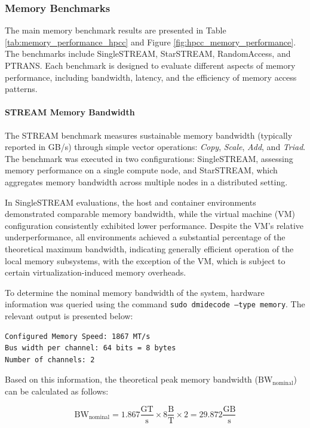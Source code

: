\subsubsection{Memory Benchmarks}
The main memory benchmark results are presented in Table \ref{tab:memory_performance_hpcc} and Figure \ref{fig:hpcc_memory_performance}. The benchmarks include SingleSTREAM, StarSTREAM, RandomAccess, and PTRANS. Each benchmark is designed to evaluate different aspects of memory performance, including bandwidth, latency, and the efficiency of memory access patterns.

\paragraph{STREAM Memory Bandwidth}

The STREAM benchmark measures sustainable memory bandwidth (typically reported in GB/s) through simple vector operations: \textit{Copy}, \textit{Scale}, \textit{Add}, and \textit{Triad}. The benchmark was executed in two configurations: SingleSTREAM, assessing memory performance on a single compute node, and StarSTREAM, which aggregates memory bandwidth across multiple nodes in a distributed setting.

In SingleSTREAM evaluations, the host and container environments demonstrated comparable memory bandwidth, while the virtual machine (VM) configuration consistently exhibited lower performance. Despite the VM's relative underperformance, all environments achieved a substantial percentage of the theoretical maximum bandwidth, indicating generally efficient operation of the local memory subsystems, with the exception of the VM, which is subject to certain virtualization-induced memory overheads.

To determine the nominal memory bandwidth of the system, hardware information was queried using the command \texttt{sudo dmidecode --type memory}. The relevant output is presented below:

\begin{verbatim}
Configured Memory Speed: 1867 MT/s
Bus width per channel: 64 bits = 8 bytes
Number of channels: 2
\end{verbatim}

Based on this information, the theoretical peak memory bandwidth ($\text{BW}_\text{nominal}$) can be calculated as follows:

\begin{equation*}
\text{BW}_\text{nominal} = 1.867 \frac{\text{GT}}{\text{s}} \times 8 \frac{\text{B}}{\text{T}} \times 2 = 29.872 \frac{\text{GB}}{\text{s}}
\end{equation*}

